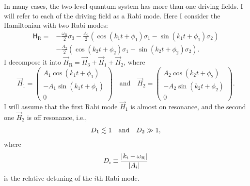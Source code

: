 In many cases, the two-level quantum system has more than one driving fields. I will refer to each of the driving field as a Rabi mode. Here I consider the Hamiltonian with two Rabi modes:
\begin{align}
    \mathsf H_{\mathrm R} =& -\frac{\omega_{\mathrm R}}{2}\sigma_3 - \frac{A_{1} }{2}  \left( \cos(k_{1} t +\phi_{1})\sigma_1  - \sin(k_{1} t +\phi_{1}) \sigma_2\right) \nonumber\\
    & - \frac{A_{2} }{2}  \left( \cos(k_{2} t +\phi_{2})\sigma_1  - \sin(k_{2} t +\phi_{2}) \sigma_2\right).
    \label{chap:matter-sec:single-frequency-eqn:hamiltonian-two-level}
\end{align}
I decompose it into $\vec{H}_{\mathrm R}=\vec{H}_3 + \vec{H}_{1} + \vec{H}_2$, where
\begin{equation*}
    \vec{H}_1 =  \begin{pmatrix}
     A_{1} \cos(k_{1}t+\phi_{1}) \\
     -A_{1} \sin(k_{1}t+\phi_{1})  \\
     0
   \end{pmatrix} \quad\text{and}\quad   \vec{H}_2 =  \begin{pmatrix}
     A_{2} \cos(k_{2}t+\phi_{2}) \\
     -A_{2} \sin(k_{2}t+\phi_{2})  \\
     0
      \end{pmatrix}.
\end{equation*}
I will assume that the first Rabi mode $\vec{H}_1$ is almost on resonance, and the second one $\vec H_2$ is off resonance, i.e.,%
\begin{equation}
D_1 \lesssim 1 \quad \text{and} \quad
D_2 \gg 1,
\end{equation}
where
\begin{equation}
D_i\equiv \frac{\lvert k_i -\omega_{\mathrm R}\rvert}{\lvert A_i\rvert}
\end{equation}
is the relative detuning of the $i$th Rabi mode.

